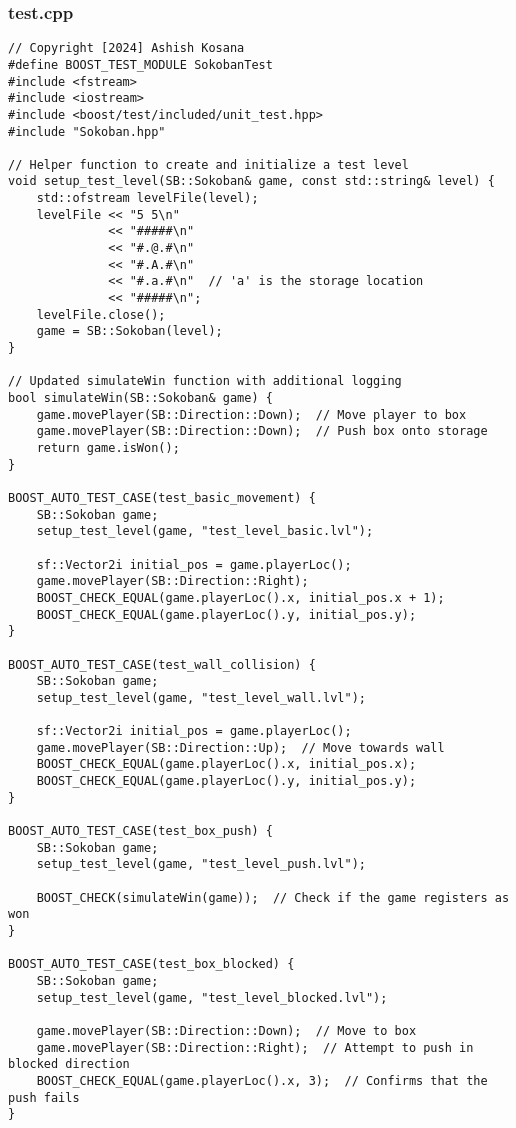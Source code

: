 \documentclass[12pt]{article}
\begin{document}
\subsubsection{test.cpp}
\begin{lstlisting}[style=cppcode]
// Copyright [2024] Ashish Kosana
#define BOOST_TEST_MODULE SokobanTest
#include <fstream>
#include <iostream>
#include <boost/test/included/unit_test.hpp>
#include "Sokoban.hpp"

// Helper function to create and initialize a test level
void setup_test_level(SB::Sokoban& game, const std::string& level) {
    std::ofstream levelFile(level);
    levelFile << "5 5\n"
              << "#####\n"
              << "#.@.#\n"
              << "#.A.#\n"
              << "#.a.#\n"  // 'a' is the storage location
              << "#####\n";
    levelFile.close();
    game = SB::Sokoban(level);
}

// Updated simulateWin function with additional logging
bool simulateWin(SB::Sokoban& game) {
    game.movePlayer(SB::Direction::Down);  // Move player to box
    game.movePlayer(SB::Direction::Down);  // Push box onto storage
    return game.isWon();
}

BOOST_AUTO_TEST_CASE(test_basic_movement) {
    SB::Sokoban game;
    setup_test_level(game, "test_level_basic.lvl");

    sf::Vector2i initial_pos = game.playerLoc();
    game.movePlayer(SB::Direction::Right);
    BOOST_CHECK_EQUAL(game.playerLoc().x, initial_pos.x + 1);
    BOOST_CHECK_EQUAL(game.playerLoc().y, initial_pos.y);
}

BOOST_AUTO_TEST_CASE(test_wall_collision) {
    SB::Sokoban game;
    setup_test_level(game, "test_level_wall.lvl");

    sf::Vector2i initial_pos = game.playerLoc();
    game.movePlayer(SB::Direction::Up);  // Move towards wall
    BOOST_CHECK_EQUAL(game.playerLoc().x, initial_pos.x);
    BOOST_CHECK_EQUAL(game.playerLoc().y, initial_pos.y);
}

BOOST_AUTO_TEST_CASE(test_box_push) {
    SB::Sokoban game;
    setup_test_level(game, "test_level_push.lvl");

    BOOST_CHECK(simulateWin(game));  // Check if the game registers as won
}

BOOST_AUTO_TEST_CASE(test_box_blocked) {
    SB::Sokoban game;
    setup_test_level(game, "test_level_blocked.lvl");

    game.movePlayer(SB::Direction::Down);  // Move to box
    game.movePlayer(SB::Direction::Right);  // Attempt to push in blocked direction
    BOOST_CHECK_EQUAL(game.playerLoc().x, 3);  // Confirms that the push fails
}


\end{lstlisting}
\end{document}
